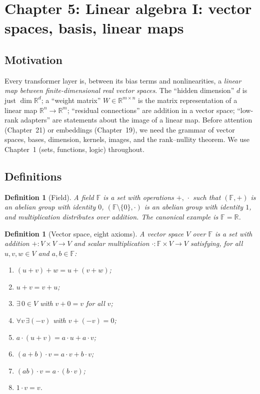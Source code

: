\documentclass[11pt]{article}
\newtheorem{definition}[theorem]{Definition}
\theoremstyle{remark}
\begin{document}

\section*{Chapter 5: Linear algebra I: vector spaces, basis, linear maps}

\subsection*{Motivation}

Every transformer layer is, between its bias terms and nonlinearities, a \emph{linear map between finite-dimensional real vector spaces}. The ``hidden dimension'' $d$ is just $\dim \mathbb{R}^d$; a ``weight matrix'' $W \in \mathbb{R}^{m \times n}$ is the matrix representation of a linear map $\mathbb{R}^n \to \mathbb{R}^m$; ``residual connections'' are addition in a vector space; ``low-rank adapters'' are statements about the image of a linear map. Before attention (Chapter~21) or embeddings (Chapter~19), we need the grammar of vector spaces, bases, dimension, kernels, images, and the rank--nullity theorem. We use Chapter~1 (sets, functions, logic) throughout.

\subsection*{Definitions}

\begin{definition}[Field]
A \emph{field} $\mathbb{F}$ is a set with operations $+,\,\cdot$ such that $(\mathbb{F},+)$ is an abelian group with identity $0$, $(\mathbb{F}\setminus\{0\},\cdot)$ is an abelian group with identity $1$, and multiplication distributes over addition. The canonical example is $\mathbb{F} = \mathbb{R}$.
\end{definition}

\begin{definition}[Vector space, eight axioms]
A \emph{vector space} $V$ over $\mathbb{F}$ is a set with addition $+\colon V\times V\to V$ and scalar multiplication $\cdot\colon \mathbb{F}\times V\to V$ satisfying, for all $u,v,w\in V$ and $a,b\in\mathbb{F}$:
\begin{enumerate}
  \item $(u+v)+w = u+(v+w)$;
  \item $u+v = v+u$;
  \item $\exists\, 0 \in V$ with $v+0=v$ for all $v$;
  \item $\forall v\,\exists (-v)$ with $v+(-v)=0$;
  \item $a\cdot(u+v) = a\cdot u + a\cdot v$;
  \item $(a+b)\cdot v = a\cdot v + b\cdot v$;
  \item $(ab)\cdot v = a\cdot(b\cdot v)$;
  \item $1\cdot v = v$.
\end{enumerate}
\end{definition}
\end{document}
